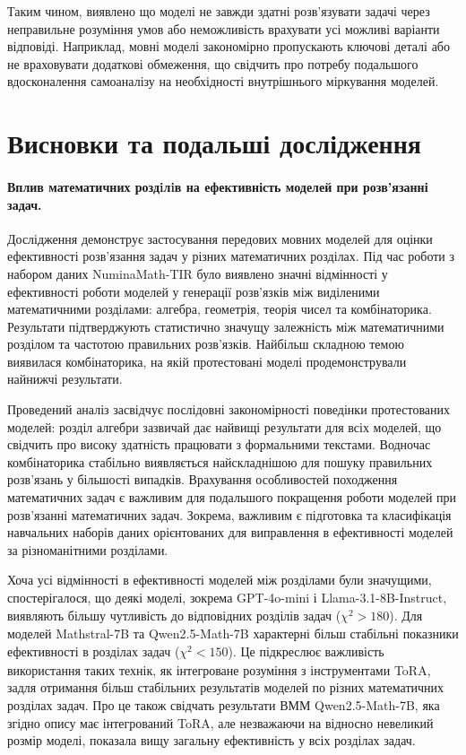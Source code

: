 Таким чином, виявлено що моделі не завжди здатні розв'язувати задачі через неправильне розуміння умов або неможливість врахувати усі можливі варіанти відповіді. Наприклад, мовні моделі закономірно пропускають ключові деталі або не враховувати додаткові обмеження, що свідчить про потребу подальшого вдосконалення самоаналізу на необхідності внутрішнього міркування моделей.

\section{Висновки та подальші дослідження}

\paragraph{Вплив математичних роздiлiв на ефективність моделей при розв'язанні задач.}
Дослідження демонструє застосування передових мовних моделей для оцінки ефективності розв’язання задач у різних математичних розділах. Під час роботи з набором даних NuminaMath-TIR було виявлено значні відмінності у ефективності роботи моделей у генерації розв'язків між виділеними математичними розділами: алгебра, геометрія, теорія чисел та комбінаторика. Результати підтверджують статистично значущу залежність між математичними розділом та частотою правильних розв’язків. Найбільш складною темою виявилася комбінаторика, на якій протестовані моделі продемонстрували найнижчі результати.

Проведений аналіз засвідчує послідовні закономірності поведінки протестованих моделей: розділ алгебри зазвичай дає найвищі результати для всіх моделей, що свідчить про високу здатність працювати з формальними текстами. Водночас комбінаторика стабільно виявляється найскладнішою для пошуку правильних розв’язань у більшості випадків. Врахування особливостей походження математичних задач є важливим для подальшого покращення роботи моделей при розв'язанні математичних задач. Зокрема, важливим є підготовка та класифікація навчальних наборів даних орієнтованих для виправлення в ефективності моделей за різноманітними розділами.

Хоча усі відмінності в ефективності моделей між розділами були значущими, спостерігалося, що деякі моделі, зокрема GPT-4o-mini і Llama-3.1-8B-Instruct, виявляють більшу чутливість до відповідних розділів задач ($\chi^2_{\text{}}>180$). Для моделей Mathstral-7B та Qwen2.5-Math-7B характерні більш стабільні показники ефективності в розділах задач ($\chi^2_{\text{}}<150$). Це підкреслює важливість використання таких технік, як інтегроване розуміння з інструментами ToRA, задля отримання більш стабільних результатів моделей по різних математичних розділах задач. Про це також свідчать результати ВММ Qwen2.5-Math-7B, яка згідно опису має інтегрований ToRA, але незважаючи на відносно невеликий розмір моделі, показала вищу загальну ефективність у всіх розділах задач.


